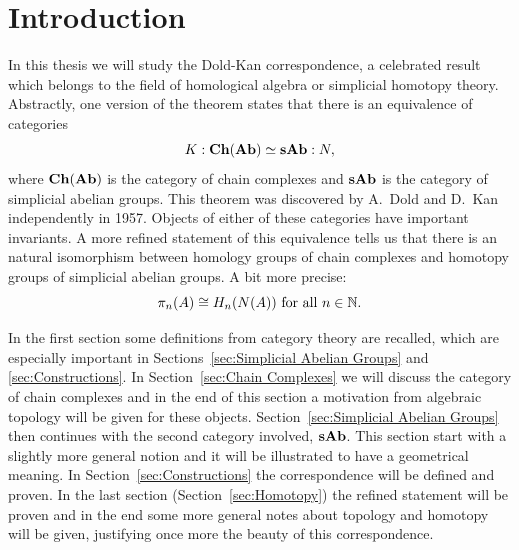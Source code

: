 \documentclass[titlepage, 11pt]{amsproc}
\theoremstyle{plain}
\theoremstyle{definition}
\begin{document}
\section*{Introduction}
In this thesis we will study the Dold-Kan correspondence, a celebrated result which belongs to the field of homological algebra or simplicial homotopy theory. Abstractly, one version of the theorem states that there is an equivalence of categories
$$ K: \mathbf{Ch}(\mathbf{Ab}) \simeq \mathbf{sAb} :N, $$
where $\mathbf{Ch}(\mathbf{Ab})$ is the category of chain complexes and $\mathbf{sAb}$ is the category of simplicial abelian groups. This theorem was discovered by A.~Dold \cite{dold} and D.~Kan \cite{kan} independently in 1957. Objects of either of these categories have important invariants. A more refined statement of this equivalence tells us that there is an natural isomorphism between homology groups of chain complexes and homotopy groups of simplicial abelian groups. A bit more precise:
$$ \pi_n(A) \cong H_n(N(A)) \text{ for all } n \in \mathbb{N}. $$

In the first section some definitions from category theory are recalled, which are especially important in Sections~\ref{sec:Simplicial Abelian Groups} and \ref{sec:Constructions}. In Section~\ref{sec:Chain Complexes} we will discuss the category of chain complexes and in the end of this section a motivation from algebraic topology will be given for these objects. Section~\ref{sec:Simplicial Abelian Groups} then continues with the second category involved, $\mathbf{sAb}$. This section start with a slightly more general notion and it will be illustrated to have a geometrical meaning. In Section~\ref{sec:Constructions} the correspondence will be defined and proven. In the last section (Section~\ref{sec:Homotopy}) the refined statement will be proven and in the end some more general notes about topology and homotopy will be given, justifying once more the beauty of this correspondence.

\newpage


\newpage


\newpage


\newpage


\newpage


\newpage
\listoftodos

\nocite{*}

	
\end{document}
